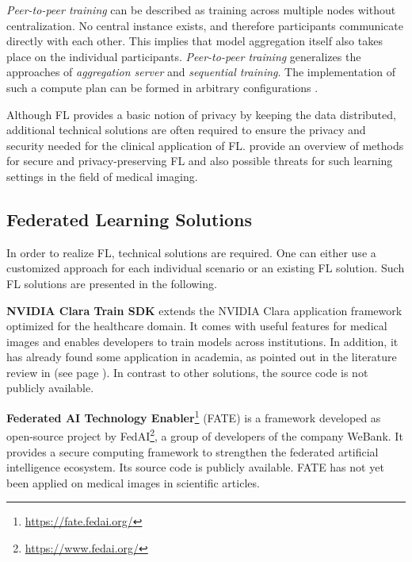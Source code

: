 \textit{Peer-to-peer training} can be described as training across multiple nodes without centralization. No central instance exists, and therefore participants communicate directly with each other. This implies that model aggregation itself also takes place on the individual participants.
\textit{Peer-to-peer training} generalizes the approaches of \textit{aggregation server} and \textit{sequential training}. The implementation of such a compute plan can be formed in arbitrary configurations \citep{Chang2018DistributedImaging, Lalitha2019Peer-to-peerGraphs, Roy2019BrainTorrent:Learning}.

Although FL provides a basic notion of privacy by keeping the data distributed, additional technical solutions are often required to ensure the privacy and security needed for the clinical application of FL. \cite{Kaissis2020SecureImaging} provide an overview of methods for secure and privacy-preserving FL and also possible threats for such learning settings in the field of medical imaging.



\subsection{Federated Learning Solutions}
\label{subsec:SolutionsFL}

In order to realize FL, technical solutions are required. One can either use a customized approach for each individual scenario or an existing FL solution. Such FL solutions are presented in the following. %

\textbf{NVIDIA Clara Train SDK}
extends the NVIDIA Clara application framework optimized for the healthcare domain. It comes with useful features for medical images and enables developers to train models across institutions. In addition, it has already found some application in academia, as pointed out in the literature review in  (see page \pageref{subsec:LitRev}). In contrast to other solutions, the source code is not publicly available.

\textbf{Federated AI Technology Enabler}\footnote{\url{https://fate.fedai.org/}}
(FATE) is a framework developed as open-source project by FedAI\footnote{\url{https://www.fedai.org/}}, a group of developers of the company WeBank. It provides a secure computing framework to strengthen the federated artificial intelligence ecosystem. Its source code is publicly available.
FATE has not yet been applied on medical images in scientific articles.

